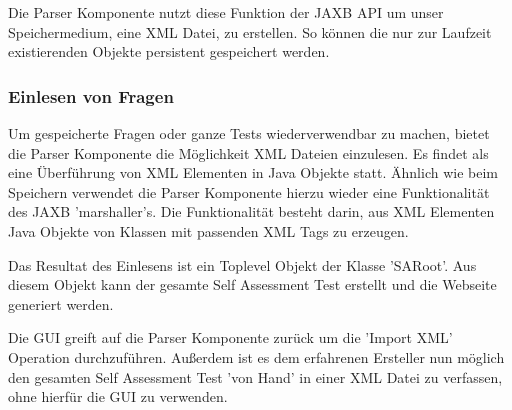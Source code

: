 Die Parser Komponente nutzt diese Funktion der JAXB API um unser Speichermedium, eine XML Datei, zu erstellen.
So können die nur zur Laufzeit existierenden Objekte persistent gespeichert werden.

\subsubsection{Einlesen von Fragen}
Um gespeicherte Fragen oder ganze Tests wiederverwendbar zu machen, bietet die Parser Komponente die Möglichkeit XML Dateien einzulesen.
Es findet als eine Überführung von XML Elementen in Java Objekte statt.
Ähnlich wie beim Speichern verwendet die Parser Komponente hierzu wieder eine Funktionalität des JAXB 'marshaller's.
Die Funktionalität besteht darin, aus XML Elementen Java Objekte von Klassen mit passenden XML Tags zu erzeugen.

Das Resultat des Einlesens ist ein Toplevel Objekt der Klasse 'SARoot'. 
Aus diesem Objekt kann der gesamte Self Assessment Test erstellt und die Webseite generiert werden. 

Die GUI greift auf die Parser Komponente zurück um die 'Import XML' Operation durchzuführen. 
Außerdem ist es dem erfahrenen Ersteller nun möglich den gesamten Self Assessment Test 'von Hand' in einer XML Datei zu verfassen, ohne hierfür die GUI zu verwenden. 

